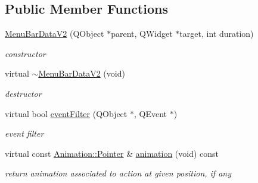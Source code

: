 \subsection*{Public Member Functions}
\begin{DoxyCompactItemize}
\item 
\mbox{\label{class_menu_bar_data_v2_a820554308ca31013ccebfc75156ce259}} 
\hyperlink{class_menu_bar_data_v2_a820554308ca31013ccebfc75156ce259}{Menu\+Bar\+Data\+V2} (Q\+Object $\ast$parent, Q\+Widget $\ast$target, int duration)
\begin{DoxyCompactList}\small\item\em constructor \end{DoxyCompactList}\item 
\mbox{\label{class_menu_bar_data_v2_a5182b6c3476c0eab1f47a914c318294a}} 
virtual \hyperlink{class_menu_bar_data_v2_a5182b6c3476c0eab1f47a914c318294a}{$\sim$\+Menu\+Bar\+Data\+V2} (void)
\begin{DoxyCompactList}\small\item\em destructor \end{DoxyCompactList}\item 
\mbox{\label{class_menu_bar_data_v2_a43e6dbf74d39aa46eb0135e99ab9612f}} 
virtual bool \hyperlink{class_menu_bar_data_v2_a43e6dbf74d39aa46eb0135e99ab9612f}{event\+Filter} (Q\+Object $\ast$, Q\+Event $\ast$)
\begin{DoxyCompactList}\small\item\em event filter \end{DoxyCompactList}\item 
\mbox{\label{class_menu_bar_data_v2_a4bb948f940b94141e0b730ce73e66e63}} 
virtual const \hyperlink{class_animation_ac48a8d074abd43dc3f6485353ba24e30}{Animation\+::\+Pointer} \& \hyperlink{class_menu_bar_data_v2_a4bb948f940b94141e0b730ce73e66e63}{animation} (void) const
\begin{DoxyCompactList}\small\item\em return animation associated to action at given position, if any \end{DoxyCompactList}\item 
\mbox{\label{class_menu_bar_data_v2_a1075516deb641b7b4f2d8da6a3a798a6}} 

\end{DoxyCompactItemize}
